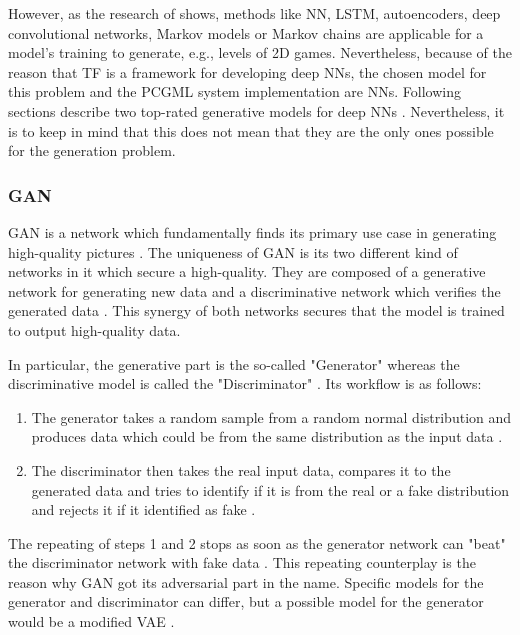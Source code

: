 \documentclass[MGS,Master,english]{twbook}%
\begin{document}
However, as the research of \cite{pcgml::paper} shows, methods like \ac{NN}, \ac{LSTM}, autoencoders, deep convolutional networks, Markov models or Markov chains are applicable for a model's training to generate, e.g., levels of \ac{2D} games. Nevertheless, because of the reason that \ac{TF} is a framework for developing deep \acp{NN}, the chosen model for this problem and the PCGML system implementation are \acp{NN}. Following sections describe two top-rated generative models for deep \acp{NN} \cite{ml::vae::tutorial}. Nevertheless, it is to keep in mind that this does not mean that they are the only ones possible for the generation problem.

\subsubsection{\acl{GAN}}
GAN is a network which fundamentally finds its primary use case in generating high-quality pictures \cite{ml::book::developer}. The uniqueness of \ac{GAN} is its two different kind of networks in it which secure a high-quality. They are composed of a generative network for generating new data and a discriminative network which verifies the generated data \cite{ml::book::developer}. This synergy of both networks secures that the model is trained to output high-quality data. 

In particular, the generative part is the so-called "Generator" whereas the discriminative model is called the "Discriminator" \cite{ml::book::developer}. Its workflow is as follows:
\begin{enumerate}
	\item The generator takes a random sample from a random normal distribution and produces data which could be from the same distribution as the input data \cite{ml::book::developer}.
	\item The discriminator then takes the real input data, compares it to the generated data and tries to identify if it is from the real or a fake distribution and rejects it if it identified as fake \cite{ml::book::developer}.
\end{enumerate} 

The repeating of steps 1 and 2 stops as soon as the generator network can "beat" the discriminator network with fake data \cite{ml::book::developer}. This repeating counterplay is the reason why GAN got its adversarial part in the name. Specific models for the generator and discriminator can differ, but a possible model for the generator would be a modified \ac{VAE} \cite{ml::book::nnProgrammingTF}.
\end{document}
